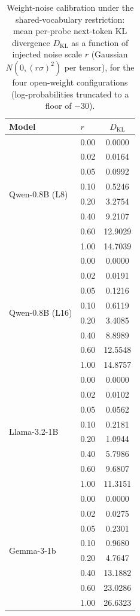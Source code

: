 \documentclass[11pt]{article}
\theoremstyle{definition}
\begin{document}
\begin{table}[t]
\centering
\small
\caption{Weight-noise calibration under the shared-vocabulary restriction:
mean per-probe next-token KL divergence $D_{\mathrm{KL}}$ as a function of
injected noise scale $r$ (Gaussian $N(0,(r\sigma)^2)$ per tensor), for the four
open-weight configurations (log-probabilities truncated to a floor of $-30$).}
\label{tab:calib}
\begin{tabular}{llc}
\toprule
Model & $r$ & $D_{\mathrm{KL}}$ \\
\midrule
\multirow{8}{*}{Qwen-0.8B (L8)} & 0.00 & 0.0000 \\
 & 0.02 & 0.0164 \\
 & 0.05 & 0.0992 \\
 & 0.10 & 0.5246 \\
 & 0.20 & 3.2754 \\
 & 0.40 & 9.2107 \\
 & 0.60 & 12.9029 \\
 & 1.00 & 14.7039 \\
\midrule
\multirow{8}{*}{Qwen-0.8B (L16)} & 0.00 & 0.0000 \\
 & 0.02 & 0.0191 \\
 & 0.05 & 0.1216 \\
 & 0.10 & 0.6119 \\
 & 0.20 & 3.4085 \\
 & 0.40 & 8.8989 \\
 & 0.60 & 12.5548 \\
 & 1.00 & 14.8757 \\
\midrule
\multirow{8}{*}{Llama-3.2-1B} & 0.00 & 0.0000 \\
 & 0.02 & 0.0102 \\
 & 0.05 & 0.0562 \\
 & 0.10 & 0.2181 \\
 & 0.20 & 1.0944 \\
 & 0.40 & 5.7986 \\
 & 0.60 & 9.6807 \\
 & 1.00 & 11.3151 \\
\midrule
\multirow{8}{*}{Gemma-3-1b} & 0.00 & 0.0000 \\
 & 0.02 & 0.0275 \\
 & 0.05 & 0.2301 \\
 & 0.10 & 0.9680 \\
 & 0.20 & 4.7647 \\
 & 0.40 & 13.1882 \\
 & 0.60 & 23.0286 \\
 & 1.00 & 26.6323 \\
\bottomrule
\end{tabular}
\end{table}
\end{document}
